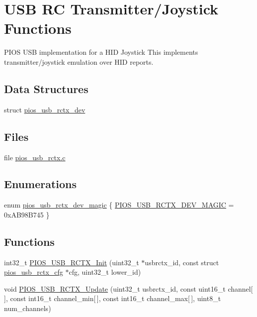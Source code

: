 \hypertarget{group___p_i_o_s___u_s_b___r_c_t_x}{\section{\-U\-S\-B \-R\-C \-Transmitter/\-Joystick \-Functions}
\label{group___p_i_o_s___u_s_b___r_c_t_x}
}


\-P\-I\-O\-S \-U\-S\-B implementation for a \-H\-I\-D \-Joystick  \-This implements transmitter/joystick emulation over \-H\-I\-D reports.  


\subsection*{\-Data \-Structures}
\begin{DoxyCompactItemize}
\item 
struct \hyperlink{structpios__usb__rctx__dev}{pios\-\_\-usb\-\_\-rctx\-\_\-dev}
\end{DoxyCompactItemize}
\subsection*{\-Files}
\begin{DoxyCompactItemize}
\item 
file \hyperlink{pios__usb__rctx_8c}{pios\-\_\-usb\-\_\-rctx.\-c}
\end{DoxyCompactItemize}
\subsection*{\-Enumerations}
\begin{DoxyCompactItemize}
\item 
enum \hyperlink{group___p_i_o_s___u_s_b___r_c_t_x_gab6be8817fc2ea56ea36728686255d0dc}{pios\-\_\-usb\-\_\-rctx\-\_\-dev\-\_\-magic} \{ \hyperlink{group___p_i_o_s___u_s_b___r_c_t_x_ggab6be8817fc2ea56ea36728686255d0dca115996decde68a659be5dc66ac2f669b}{\-P\-I\-O\-S\-\_\-\-U\-S\-B\-\_\-\-R\-C\-T\-X\-\_\-\-D\-E\-V\-\_\-\-M\-A\-G\-I\-C} =  0x\-A\-B98\-B745
 \}
\end{DoxyCompactItemize}
\subsection*{\-Functions}
\begin{DoxyCompactItemize}
\item 
int32\-\_\-t \hyperlink{group___p_i_o_s___u_s_b___r_c_t_x_ga335e2cdbbb185681f189b0f030bd712c}{\-P\-I\-O\-S\-\_\-\-U\-S\-B\-\_\-\-R\-C\-T\-X\-\_\-\-Init} (uint32\-\_\-t $\ast$usbrctx\-\_\-id, const struct \hyperlink{structpios__usb__rctx__cfg}{pios\-\_\-usb\-\_\-rctx\-\_\-cfg} $\ast$cfg, uint32\-\_\-t lower\-\_\-id)
\item 
void \hyperlink{group___p_i_o_s___u_s_b___r_c_t_x_gaf82632897875fdc4d211a82e7ffb1103}{\-P\-I\-O\-S\-\_\-\-U\-S\-B\-\_\-\-R\-C\-T\-X\-\_\-\-Update} (uint32\-\_\-t usbrctx\-\_\-id, const uint16\-\_\-t channel\mbox{[}$\,$\mbox{]}, const int16\-\_\-t channel\-\_\-min\mbox{[}$\,$\mbox{]}, const int16\-\_\-t channel\-\_\-max\mbox{[}$\,$\mbox{]}, uint8\-\_\-t num\-\_\-channels)
\end{DoxyCompactItemize}
